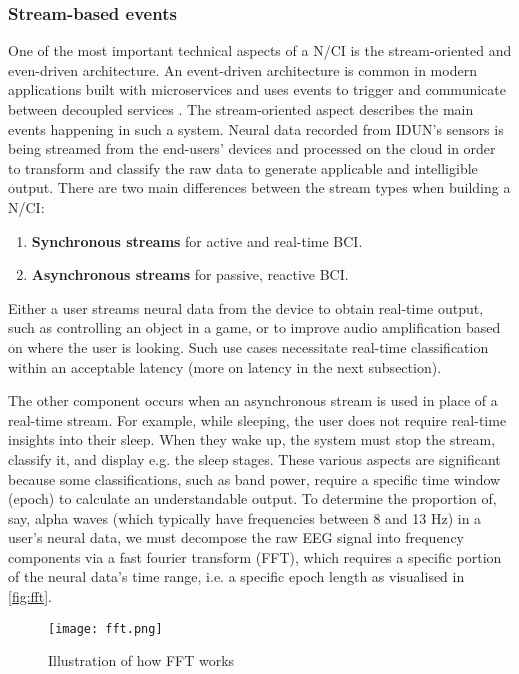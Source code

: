\subsubsection{Stream-based events}
\label{chapter5-stream-based-events}

One of the most important technical aspects of a N/CI is the stream-oriented and even-driven architecture. An event-driven architecture is common in modern applications built with microservices and uses events to trigger and communicate between decoupled services \citep{amazon_web_services_inc_event-driven_nodate}. The stream-oriented aspect describes the main events happening in such a system. Neural data recorded from IDUN's sensors is being streamed from the end-users' devices and processed on the cloud in order to transform and classify the raw data to generate applicable and intelligible output. There are two main differences between the stream types when building a N/CI:

\begin{enumerate}
\item \textbf{Synchronous streams} for active and real-time BCI.
\item \textbf{Asynchronous streams} for passive, reactive BCI.
\end{enumerate}

Either a user streams neural data from the device to obtain real-time output, such as controlling an object in a game, or to improve audio amplification based on where the user is looking. Such use cases necessitate real-time classification within an acceptable latency (more on latency in the next subsection).

The other component occurs when an asynchronous stream is used in place of a real-time stream. For example, while sleeping, the user does not require real-time insights into their sleep. When they wake up, the system must stop the stream, classify it, and display e.g. the sleep stages. These various aspects are significant because some classifications, such as band power, require a specific time window (epoch) to calculate an understandable output. To determine the proportion of, say, alpha waves (which typically have frequencies between 8 and 13 Hz) in a user's neural data, we must decompose the raw EEG signal into frequency components via a fast fourier transform (FFT), which requires a specific portion of the neural data's time range, i.e. a specific epoch length as visualised in \autoref{fig:fft}. 

\begin{figure}[!ht]
  \centering
  \texttt{[image: fft.png]}
  \caption[Illustration of how FFT works]{Illustration of how FFT works \citep{3blue1brown_but_2018}}
  \label{fig:fft}
\end{figure}

